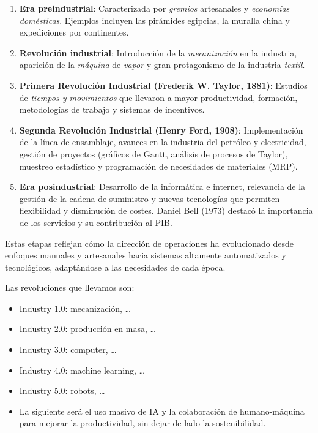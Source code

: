 \documentclass[12pt]{report} %
\providecommand{\tightlist}{%
  \setlength{\itemsep}{0pt}\setlength{\parskip}{0pt}}
\begin{document}
\begin{enumerate}
\def\labelenumi{\arabic{enumi}.}
\item
  \textbf{Era preindustrial}: Caracterizada por \emph{gremios}
  artesanales y \emph{economías} \emph{domésticas}. Ejemplos incluyen
  las pirámides egipcias, la muralla china y expediciones por
  continentes.
\item
  \textbf{Revolución industrial}: Introducción de la \emph{mecanización}
  en la industria, aparición de la \emph{máquina} de \emph{vapor} y gran
  protagonismo de la industria \emph{textil}.
\item
  \textbf{Primera Revolución Industrial (Frederik W. Taylor, 1881)}:
  Estudios de \emph{tiempos y movimientos} que llevaron a mayor
  productividad, formación, metodologías de trabajo y sistemas de
  incentivos.
\item
  \textbf{Segunda Revolución Industrial (Henry Ford, 1908)}:
  Implementación de la línea de ensamblaje, avances en la industria del
  petróleo y electricidad, gestión de proyectos (gráficos de Gantt,
  análisis de procesos de Taylor), muestreo estadístico y programación
  de necesidades de materiales (MRP).
\item
  \textbf{Era posindustrial}: Desarrollo de la informática e internet,
  relevancia de la gestión de la cadena de suministro y nuevas
  tecnologías que permiten flexibilidad y disminución de costes. Daniel
  Bell (1973) destacó la importancia de los servicios y su contribución
  al PIB.
\end{enumerate}

Estas etapas reflejan cómo la dirección de operaciones ha evolucionado
desde enfoques manuales y artesanales hacia sistemas altamente
automatizados y tecnológicos, adaptándose a las necesidades de cada
época.

Las revoluciones que llevamos son:

\begin{itemize}
\tightlist
\item
  Industry 1.0: mecanización, \ldots{}\\
\item
  Industry 2.0: producción en masa, \ldots{}\\
\item
  Industry 3.0: computer, \ldots{}\\
\item
  Industry 4.0: machine learning, \ldots{}\\
\item
  Industry 5.0: robots, \ldots{}\\
\item
  La siguiente será el uso masivo de IA y la colaboración de
  humano-máquina para mejorar la productividad, sin dejar de lado la
  sostenibilidad.
\end{itemize}
\end{document}
